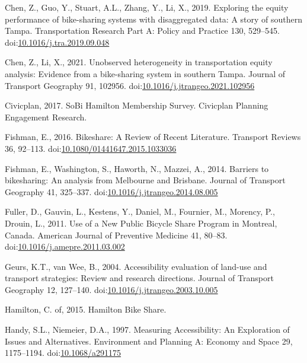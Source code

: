 \documentclass[]{elsarticle} %
\begin{document}
\leavevmode\hypertarget{ref-chenExploringEquityPerformance2019}{}%
Chen, Z., Guo, Y., Stuart, A.L., Zhang, Y., Li, X., 2019. Exploring the
equity performance of bike-sharing systems with disaggregated data: A
story of southern Tampa. Transportation Research Part A: Policy and
Practice 130, 529--545.
doi:\href{https://doi.org/10.1016/j.tra.2019.09.048}{10.1016/j.tra.2019.09.048}

\leavevmode\hypertarget{ref-chenUnobservedHeterogeneityTransportation2021}{}%
Chen, Z., Li, X., 2021. Unobserved heterogeneity in transportation
equity analysis: Evidence from a bike-sharing system in southern Tampa.
Journal of Transport Geography 91, 102956.
doi:\href{https://doi.org/10.1016/j.jtrangeo.2021.102956}{10.1016/j.jtrangeo.2021.102956}

\leavevmode\hypertarget{ref-civicplanSoBiHamiltonMembership2017}{}%
Civicplan, 2017. SoBi Hamilton Membership Survey. Civicplan \textbar{}
Planning Engagement Research.

\leavevmode\hypertarget{ref-fishmanBikeshareReviewRecent2016}{}%
Fishman, E., 2016. Bikeshare: A Review of Recent Literature. Transport
Reviews 36, 92--113.
doi:\href{https://doi.org/10.1080/01441647.2015.1033036}{10.1080/01441647.2015.1033036}

\leavevmode\hypertarget{ref-fishmanBarriersBikesharingAnalysis2014}{}%
Fishman, E., Washington, S., Haworth, N., Mazzei, A., 2014. Barriers to
bikesharing: An analysis from Melbourne and Brisbane. Journal of
Transport Geography 41, 325--337.
doi:\href{https://doi.org/10.1016/j.jtrangeo.2014.08.005}{10.1016/j.jtrangeo.2014.08.005}

\leavevmode\hypertarget{ref-fullerUseNewPublic2011}{}%
Fuller, D., Gauvin, L., Kestens, Y., Daniel, M., Fournier, M., Morency,
P., Drouin, L., 2011. Use of a New Public Bicycle Share Program in
Montreal, Canada. American Journal of Preventive Medicine 41, 80--83.
doi:\href{https://doi.org/10.1016/j.amepre.2011.03.002}{10.1016/j.amepre.2011.03.002}

\leavevmode\hypertarget{ref-geursAccessibilityEvaluationLanduse2004}{}%
Geurs, K.T., van Wee, B., 2004. Accessibility evaluation of land-use and
transport strategies: Review and research directions. Journal of
Transport Geography 12, 127--140.
doi:\href{https://doi.org/10.1016/j.jtrangeo.2003.10.005}{10.1016/j.jtrangeo.2003.10.005}

\leavevmode\hypertarget{ref-hamiltonHamiltonBikeShare2015}{}%
Hamilton, C. of, 2015. Hamilton Bike Share.

\leavevmode\hypertarget{ref-handyMeasuringAccessibilityExploration1997}{}%
Handy, S.L., Niemeier, D.A., 1997. Measuring Accessibility: An
Exploration of Issues and Alternatives. Environment and Planning A:
Economy and Space 29, 1175--1194.
doi:\href{https://doi.org/10.1068/a291175}{10.1068/a291175}
\end{document}
